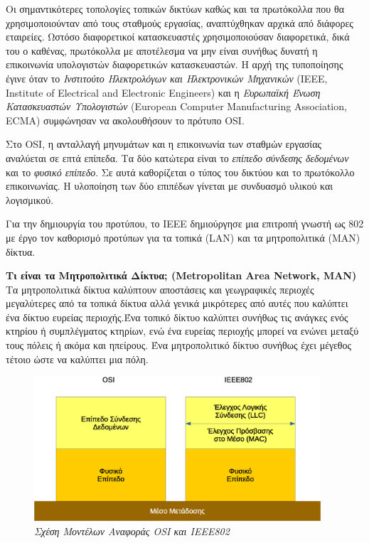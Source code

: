 Οι σημαντικότερες τοπολογίες τοπικών δικτύων καθώς και τα πρωτόκολλα που θα χρησιμοποιούνταν από τους σταθμούς εργασίας, αναπτύχθηκαν αρχικά από διάφορες εταιρείες. Ωστόσο διαφορετικοί κατασκευαστές χρησιμοποιούσαν διαφορετικά, δικά του ο καθένας, πρωτόκολλα με αποτέλεσμα να μην είναι συνήθως δυνατή η επικοινωνία υπολογιστών διαφορετικών κατασκευαστών. Η αρχή της τυποποίησης έγινε όταν το \emph{Ινστιτούτο Ηλεκτρολόγων και Ηλεκτρονικών Μηχανικών} (IEEE, Institute of Electrical and Electronic Engineers) και η \emph{Ευρωπαϊκή Ένωση Κατασκευαστών Υπολογιστών} (European Computer Manufacturing Association, ECMA) συμφώνησαν να ακολουθήσουν το πρότυπο OSI. 

Στο OSI, η ανταλλαγή μηνυμάτων και η επικοινωνία των σταθμών εργασίας αναλύεται σε επτά επίπεδα. Τα δύο κατώτερα είναι το \emph{επίπεδο σύνδεσης δεδομένων} και το \emph{φυσικό επίπεδο}. Σε αυτά καθορίζεται ο τύπος του δικτύου και το πρωτόκολλο επικοινωνίας. Η υλοποίηση των δύο επιπέδων γίνεται με συνδυασμό υλικού και λογισμικού.

Για την δημιουργία του προτύπου, το IEEE δημιούργησε μια επιτροπή γνωστή ως 802 με έργο τον καθορισμό προτύπων για τα τοπικά (LAN) και τα μητροπολιτικά (ΜΑΝ) δίκτυα. 

\parbox{\textwidth}{
\boxline
\textbf{Τι είναι τα Μητροπολιτικά Δίκτυα; (Metropolitan Area Network, MAN)}\\

Τα μητροπολιτικά δίκτυα καλύπτουν αποστάσεις και γεωγραφικές περιοχές μεγαλύτερες από τα τοπικά δίκτυα αλλά γενικά μικρότερες από αυτές που καλύπτει ένα δίκτυο ευρείας περιοχής.Ένα τοπικό δίκτυο καλύπτει συνήθως τις ανάγκες ενός κτηρίου ή συμπλέγματος κτηρίων, ενώ ένα ευρείας περιοχής μπορεί να ενώνει μεταξύ τους πόλεις ή ακόμα και ηπείρους. Ένα μητροπολιτικό δίκτυο συνήθως έχει μέγεθος τέτοιο ώστε να καλύπτει μια πόλη.\\
\boxline
}

\begin{figure}[!ht]
  \centering
  \includegraphics[width=0.95\textwidth]{images/chapter2/2-2}
  \caption {\textsl{Σχέση Μοντέλων Αναφοράς OSI και IEEE802}}
  \label{2-2}
\end{figure}

